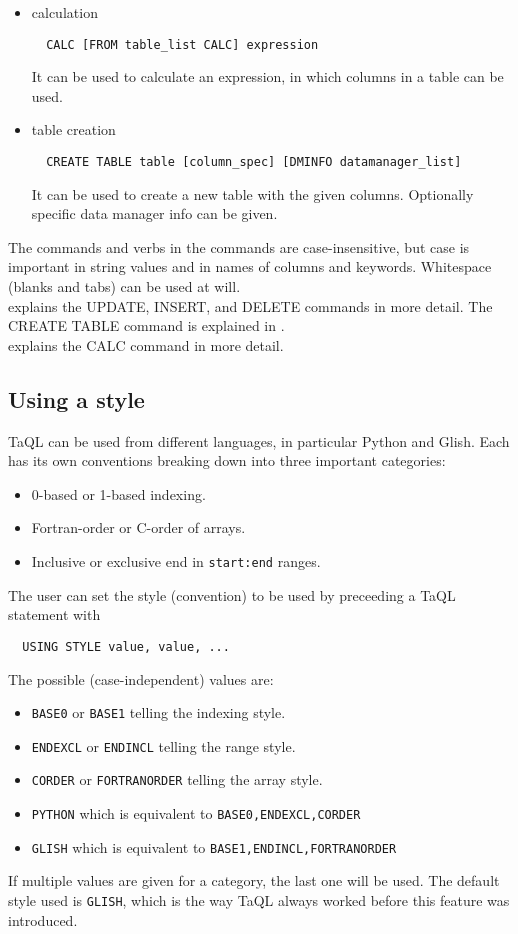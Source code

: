 \begin{itemize}
\item calculation
\begin{verbatim}
  CALC [FROM table_list CALC] expression
\end{verbatim}
It can be used to calculate an expression, in which columns
in a table can be used.

\item table creation
\begin{verbatim}
  CREATE TABLE table [column_spec] [DMINFO datamanager_list]
\end{verbatim}
It can be used to create a new table with the given columns.
Optionally specific data manager info can be given.

\end{itemize}
The commands and verbs in the commands are
case-insensitive, but case is important in string values and
in names of columns and keywords. Whitespace (blanks and tabs) can
be used at will.
\\ explains the
UPDATE, INSERT, and DELETE commands in more detail. The CREATE TABLE command is
explained in .
\\
explains the CALC command in more detail.

\subsection{Using a style}
TaQL can be used from different languages, in particular Python and
Glish. Each has its own conventions breaking down into three important
categories: 
\begin{itemize}
\item 0-based or 1-based indexing.
\item Fortran-order or C-order of arrays.
\item Inclusive or exclusive end in \texttt{start:end} ranges.
\end{itemize}
The user can set the style (convention) to be used by preceeding a
TaQL statement with
\begin{verbatim}
  USING STYLE value, value, ...
\end{verbatim}
The possible (case-independent) values are:
\begin{itemize}
\item \texttt{BASE0} or \texttt{BASE1} telling the indexing style.
\item \texttt{ENDEXCL} or \texttt{ENDINCL} telling the range style.
\item \texttt{CORDER} or \texttt{FORTRANORDER} telling the array style.
\item \texttt{PYTHON} which is equivalent to \texttt{BASE0,ENDEXCL,CORDER}
\item \texttt{GLISH} which is equivalent to \texttt{BASE1,ENDINCL,FORTRANORDER}
\end{itemize}
If multiple values are given for a category, the last one will be used.
The default style used is \texttt{GLISH}, which is the way TaQL always
worked before this feature was introduced.

